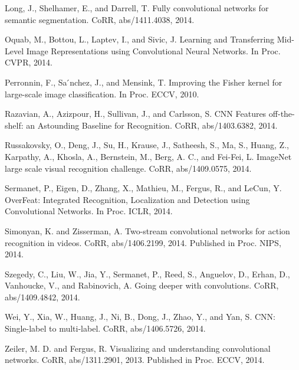 \documentclass[12pt,a4paper,UTF8,twoside]{book}
\begin{document}
Long, J., Shelhamer, E., and Darrell, T. Fully convolutional networks for semantic segmentation. CoRR, abs/1411.4038, 2014.

Oquab, M., Bottou, L., Laptev, I., and Sivic, J. Learning and Transferring Mid-Level Image Representations using Convolutional Neural Networks. In Proc. CVPR, 2014.

Perronnin, F., Sa ́nchez, J., and Mensink, T. Improving the Fisher kernel for large-scale image classification. In Proc. ECCV, 2010.

Razavian, A., Azizpour, H., Sullivan, J., and Carlsson, S. CNN Features off-the-shelf: an Astounding Baseline for Recognition. CoRR, abs/1403.6382, 2014.

Russakovsky, O., Deng, J., Su, H., Krause, J., Satheesh, S., Ma, S., Huang, Z., Karpathy, A., Khosla, A., Bernstein, M., Berg, A. C., and Fei-Fei, L. ImageNet large scale visual recognition challenge. CoRR, abs/1409.0575, 2014.

Sermanet, P., Eigen, D., Zhang, X., Mathieu, M., Fergus, R., and LeCun, Y. OverFeat: Integrated Recognition, Localization and Detection using Convolutional Networks. In Proc. ICLR, 2014.

Simonyan, K. and Zisserman, A. Two-stream convolutional networks for action recognition in videos. CoRR, abs/1406.2199, 2014. Published in Proc. NIPS, 2014.

Szegedy, C., Liu, W., Jia, Y., Sermanet, P., Reed, S., Anguelov, D., Erhan, D., Vanhoucke, V., and Rabinovich, A. Going deeper with convolutions. CoRR, abs/1409.4842, 2014.

Wei, Y., Xia, W., Huang, J., Ni, B., Dong, J., Zhao, Y., and Yan, S. CNN: Single-label to multi-label. CoRR, abs/1406.5726, 2014.

Zeiler, M. D. and Fergus, R. Visualizing and understanding convolutional networks. CoRR, abs/1311.2901, 2013. Published in Proc. ECCV, 2014.


\backmatter
\end{document}
